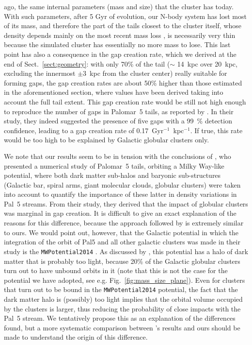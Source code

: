 \documentclass[draft]{aa}
\begin{document}
ago, the same internal parameters (mass and size) that the cluster has today. With such parameters, after 5 Gyr of evolution, our N-body system has lost most of its mass, and therefore the part of the tails closest to the cluster itself, whose density depends mainly on the most recent mass loss \citep[see, for example, Fig.~A.3 in][]{2012A&A...546L...7M}, is necessarily very thin because the simulated cluster has essentially no more mass to lose. This last point has also a consequence in the gap creation rate, which we derived at the end of Sect.~\ref{sect:geometry}: with only 70\% of the tail  ($\sim$ 14~kpc over 20~kpc, excluding the innermost $\pm 3$~kpc from the cluster center) really suitable for forming gaps, the gap creation rates are about 50$\%$ higher than those estimated in the aforementioned section, where values have been derived taking into account the full tail extent.  This gap creation rate would be still not high enough to reproduce the  number of gaps in Palomar~5 tails, as reported by \citet{2012ApJ...760...75C}. In their study, they indeed suggested the presence of  five gaps with a 99~\% detection confidence, leading to a gap creation rate of 0.17~Gyr$^{-1}$~kpc$^{-1}$. If true, this rate would be too high to be explained by Galactic globular clusters only. 
  
  We note that our results seem to be in tension with the conclusions of \citet{2019MNRAS.484.2009B}, who presented a numerical study of Palomar~5 tails, orbiting a Milky Way-like potential, where both dark matter sub-halos and baryonic sub-structures (Galactic bar, spiral arms, giant molecular clouds, globular clusters) were taken into account to quantify the importance of these latter in density variations in Pal~5 streams. From their study, they derived that the impact of globular clusters was marginal in gap creation. It is difficult to give an exact explanation of the reasons for this difference, because the approach followed by  \citet{2019MNRAS.484.2009B} is extremely similar to ours. We would point out, however, that the Galactic potential in which the integration of the orbit of Pal5 and all other galactic clusters was made in their study is the \texttt{MWPotential2014} \citep{2015ApJS..216...29B}. As discussed by \citet{2022ApJ...926..107M}, this potential has a halo of dark matter that is probably too light, because 20\% of the Galactic globular clusters turn out to have unbound orbits in it (note that this is not the case for the potential we have adopted, see e.g. Fig.~\ref{fig:mass_size_plane}). Even for clusters that turn out to be bound in the  \texttt{MWPotential2014} potential, the fact that the dark matter halo is (possibly) too light implies that the orbital volume occupied by the clusters is larger, thus reducing the probability of close impacts with the Pal~5 stream. We tentatively propose this as an explanation of the differences found, but a more systematic comparison between \citet{2019MNRAS.484.2009B}'s results and ours should be made to understand the origin of this difference. \\
  
\end{document}
